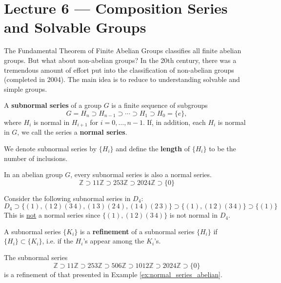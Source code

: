 \section{Lecture 6 — Composition Series and Solvable Groups}

The Fundamental Theorem of Finite Abelian Groups classifies all finite abelian groups. But what about non-abelian groups? In the 20th century, there was a tremendous amount of effort put into the classification of non-abelian groups (completed in 2004). The main idea is to reduce to understanding solvable and simple groups.

\begin{definition}
	A \textbf{subnormal series} of a group $G$ is a finite sequence of subgroups
	$$G=H_n\supset H_{n-1}\supset\cdots\supset H_1\supset H_0=\{e\},$$
	where $H_i$ is normal in $H_{i+1}$ for $i=0,\hdots,n-1$. If, in addition, each $H_i$ is normal in $G$, we call the series a \textbf{normal series}.

	We denote subnormal series by $\{H_i\}$ and define the \textbf{length} of $\{H_i\}$ to be the number of inclusions.
\end{definition}

\begin{example}\label{ex:normal_series_abelian}
	In an abelian group $G$, every subnormal series is also a normal series.
	$$\mathbb Z\supset 11\mathbb Z\supset 253\mathbb Z\supset 2024\mathbb Z\supset\{0\}$$
\end{example}

\begin{example}
	Consider the following subnormal series in $D_4$:
	$$D_4\supset\{(1),(1\,2)(3\,4),(1\,3)(2\,4),(1\,4)(2\,3)\}\supset \{(1),(1\,2)(3\,4)\}\supset\{(1)\}$$
	This is \underline{not} a normal series since $\{(1),(1\,2)(3\,4)\}$ is not normal in $D_4$.
\end{example}

\begin{definition}
	A subnormal series $\{K_i\}$ is a \textbf{refinement} of a subnormal series $\{H_i\}$ if $\{H_i\}\subset\{K_i\}$, i.e. if the $H_i$'s appear among the $K_i$'s.
\end{definition}

\begin{example}
	The subnormal series
	$$\mathbb Z\supset 11\mathbb Z\supset 253\mathbb Z\supset 506\mathbb Z\supset 1012\mathbb Z\supset 2024\mathbb Z\supset\{0\}$$
	is a refinement of that presented in Example \ref{ex:normal_series_abelian}.
\end{example}

